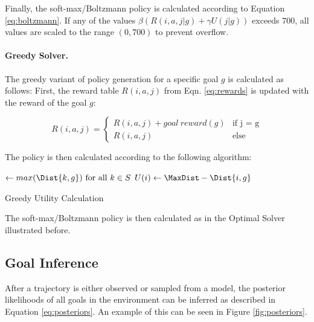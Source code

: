 Finally, the soft-max/Boltzmann policy is calculated according to Equation \ref{eq:boltzmann}.
If any of the values $\beta(  R(i,a,j|g) + \gamma U(j|g))$ exceeds $700$, all values are scaled to the range $(0,700)$ to prevent overflow.



\paragraph{Greedy Solver.}
The greedy variant of policy generation for a specific goal $g$ is calculated as follows:
First, the reward table $R(i,a,j)$ from Eqn. \ref{eq:rewards} is updated with the reward of the goal $g$:

\[
R(i,a,j) = \begin{cases}
	R(i,a,j) + goal~reward(g) & \text{if j = g}\\
	R(i,a,j) & \text{else}
\end{cases}
\]

The policy is then calculated according to the following algorithm:

\begin{algorithm}
	\SetAlgoLined
	\DontPrintSemicolon
	\BlankLine
	\MaxDist$\leftarrow max(\Dist{k,g}) \text{ for all } k\in S$\;
	$U(i) \leftarrow \MaxDist - \Dist{i,g} $\; %
	\caption{Greedy Utility Calculation}
\end{algorithm}

The soft-max/Boltzmann policy is then calculated as in the Optimal Solver illustrated before.


\subsection{Goal Inference}

After a trajectory is either observed or sampled from a model, the posterior likelihoods of all goals in the environment can be inferred as described in Equation \ref{eq:posteriors}.
An example of this can be seen in Figure \ref{fig:posteriors}.


